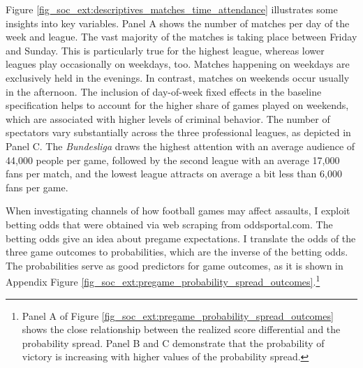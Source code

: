 


Figure \ref{fig_soc_ext:descriptives_matches_time_attendance} illustrates some insights into key variables. Panel A shows the number of matches per day of the week and league. The vast majority of the matches is taking place between Friday and Sunday. This is particularly true for the highest league, whereas lower leagues play occasionally on weekdays, too. Matches happening on weekdays are exclusively held in the evenings. In contrast, matches on weekends occur usually in the afternoon. The inclusion of day-of-week fixed effects in the baseline specification helps to account for the higher share of games played on weekends, which are associated with higher levels of criminal behavior. The number of spectators vary substantially across the three professional leagues, as depicted in Panel C. The \textit{Bundesliga} draws the highest attention with an average audience of 44,000 people per game, followed by the second league with an average 17,000 fans per match, and the lowest league attracts on average a bit less than 6,000 fans per game.

When investigating channels of how football games may affect assaults, I exploit betting odds that were obtained via web scraping from oddsportal.com. The betting odds give an idea about pregame expectations. I translate the odds of the three game outcomes to probabilities, which are the inverse of the betting odds. The probabilities serve as good predictors for game outcomes, as it is shown in Appendix Figure \ref{fig_soc_ext:pregame_probability_spread_outcomes}.\footnote{Panel A of Figure \ref{fig_soc_ext:pregame_probability_spread_outcomes} shows the close relationship between the realized score differential and the probability spread. Panel B and C demonstrate that the probability of victory is increasing with higher values of the probability spread.}


